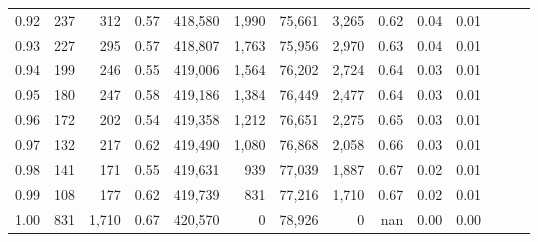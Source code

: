 \begin{tabular}{rrrrrrrrrrrrrr}
0.92 &    237 &    312 &  0.57 &  418,580 &    1,990 &  75,661 &   3,265 &  0.62 &  0.04 &      0.01 \\
0.93 &    227 &    295 &  0.57 &  418,807 &    1,763 &  75,956 &   2,970 &  0.63 &  0.04 &      0.01 \\
0.94 &    199 &    246 &  0.55 &  419,006 &    1,564 &  76,202 &   2,724 &  0.64 &  0.03 &      0.01 \\
0.95 &    180 &    247 &  0.58 &  419,186 &    1,384 &  76,449 &   2,477 &  0.64 &  0.03 &      0.01 \\
0.96 &    172 &    202 &  0.54 &  419,358 &    1,212 &  76,651 &   2,275 &  0.65 &  0.03 &      0.01 \\
0.97 &    132 &    217 &  0.62 &  419,490 &    1,080 &  76,868 &   2,058 &  0.66 &  0.03 &      0.01 \\
0.98 &    141 &    171 &  0.55 &  419,631 &      939 &  77,039 &   1,887 &  0.67 &  0.02 &      0.01 \\
0.99 &    108 &    177 &  0.62 &  419,739 &      831 &  77,216 &   1,710 &  0.67 &  0.02 &      0.01 \\
1.00 &    831 &  1,710 &  0.67 &  420,570 &        0 &  78,926 &       0 &   nan &  0.00 &      0.00 \\
\bottomrule
\end{tabular}
